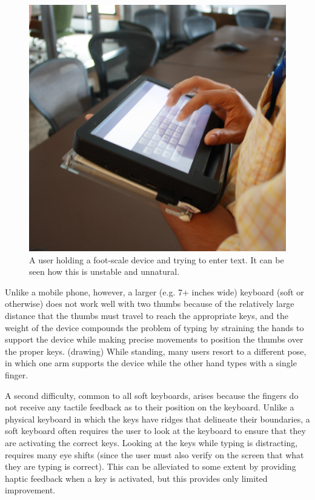 \begin{figure}
    \includegraphics[scale=0.35]{Figures/device_hold.eps} 
  	\caption{A user holding a foot-scale device and trying to enter text. It can be seen how this is unstable and unnatural.}
\end{figure}

Unlike a mobile phone, however, a larger (e.g. 7+ inches wide)
keyboard (soft or otherwise) does not work well with two thumbs
because of the relatively large distance that the thumbs must travel
to reach the appropriate keys, and the weight of the device compounds
the problem of typing by straining the hands to support the device
while making precise movements to position the thumbs over the proper
keys. (drawing) While standing, many users resort to a different pose,
in which one arm supports the device while the other hand types with a
single finger.

A second difficulty, common to all soft keyboards, arises because the
fingers do not receive any tactile feedback as to their position on
the keyboard.  Unlike a physical keyboard in which the keys have
ridges that delineate their boundaries, a soft keyboard often requires
the user to look at the keyboard to ensure that they are activating
the correct keys.  Looking at the keys while typing is distracting,
requires many eye shifts (since the user must also verify on the
screen that what they are typing is correct).  This can be alleviated
to some extent by providing haptic feedback when a key is activated,
but this provides only limited improvement.

